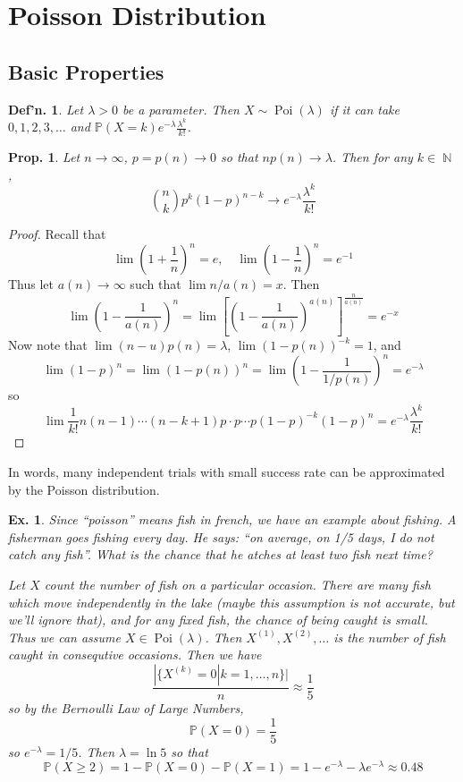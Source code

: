 \documentclass[12pt, a4paper]{book}
\DeclareMathOperator{\N}{\mathbb{N}}
\DeclareMathOperator{\Poi}{Poi}
\renewcommand{\Pr}{\mathbb{P}}
\newtheorem{definition}[theorem]{Def'n.}
\newtheorem{proposition}[theorem]{Prop.}
\newtheorem{example}[theorem]{Ex.}
\theoremstyle{nonumberplain}
\newtheorem{proof}{Proof}
\begin{document}
\section{Poisson Distribution}
\subsection{Basic Properties}
\begin{definition}
    Let $\lambda>0$ be a parameter.
    Then $X\sim\Poi(\lambda)$ if it can take $0,1,2,3,\ldots$ and $\Pr(X=k)e^{-\lambda}\frac{\lambda^k}{k!}$.
\end{definition}
\begin{proposition}
    Let $n\to\infty$, $p=p(n)\to 0$ so that $np(n)\to\lambda$.
    Then for any $k\in\N$,
    \[\binom{n}{k}p^k(1-p)^{n-k}\to e^{-\lambda}\frac{\lambda^k}{k!}\]
\end{proposition}
\begin{proof}
    Recall that
    \[\lim\left(1+\frac{1}{n}\right)^n=e,\quad\lim\left(1-\frac{1}{n}\right)^n=e^{-1}\]
    Thus let $a(n)\to\infty$ such that $\lim n/a(n)=x$.
    Then
    \[\lim\left(1-\frac{1}{a(n)}\right)^n = \lim\left[\left(1-\frac{1}{a(n)}\right)^{a(n)}\right]^{\frac{n}{a(n)}}=e^{-x}\]
    Now note that $\lim (n-u)p(n)=\lambda$, $\lim(1-p(n))^{-k}=1$, and
    \[\lim(1-p)^n=\lim(1-p(n))^n=\lim\left(1-\frac{1}{1/p(n)}\right)^n=e^{-\lambda}\]
    so
    \begin{equation*}
        \lim\frac{1}{k!}n(n-1)\cdots(n-k+1)p\cdot p\cdots p (1-p)^{-k}(1-p)^n=e^{-\lambda}\frac{\lambda^k}{k!}
    \end{equation*}
\end{proof}
In words, many independent trials with small success rate can be approximated by the Poisson distribution.
\begin{example}
    Since ``poisson'' means fish in french, we have an example about fishing.
    A fisherman goes fishing every day.
    He says: ``on average, on 1/5 days, I do not catch any fish''.
    What is the chance that he atches at least two fish next time?

    Let $X$ count the number of fish on a particular occasion.
    There are many fish which move independently in the lake (maybe this assumption is not accurate, but we'll ignore that), and for any fixed fish, the chance of being caught is small.
    Thus we can assume $X\in\Poi(\lambda)$.
    Then $X^{(1)},X^{(2)},\ldots$ is the number of fish caught in consequtive occasions.
    Then we have
    \[\frac{|\{X^{(k)}=0|k=1,\ldots,n\}|}{n}\approx\frac{1}{5}\]
    so by the Bernoulli Law of Large Numbers,
    \[\Pr(X=0)=\frac{1}{5}\]
    so $e^{-\lambda}=1/5$.
    Then $\lambda=\ln 5$ so that
    \[\Pr(X\geq 2)=1-\Pr(X=0)-\Pr(X=1)=1-e^{-\lambda}-\lambda e^{-\lambda}\approx 0.48\]
\end{example}
\end{document}
